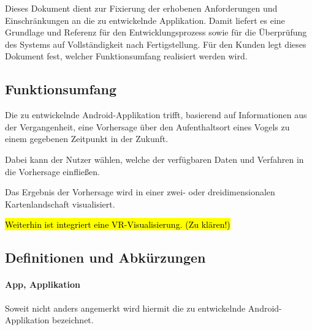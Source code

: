 \documentclass[12pt]{article} %
\begin{document}

 Dieses Dokument dient  zur Fixierung der erhobenen Anforderungen und Einschränkungen an die zu entwickelnde Applikation. Damit liefert es eine Grundlage und Referenz für den Entwicklungsprozess sowie für die Überprüfung des Systems auf Vollständigkeit nach Fertigstellung. Für den Kunden legt dieses Dokument fest, welcher Funktionsumfang realisiert werden wird.


\subsection{Funktionsumfang}

Die zu entwickelnde Android-Applikation trifft, basierend auf Informationen aus der Vergangenheit, eine Vorhersage über den Aufenthaltsort eines Vogels zu einem gegebenen Zeitpunkt in der Zukunft. 

Dabei kann der Nutzer wählen, welche der verfügbaren Daten und Verfahren in die Vorhersage einfließen. 

Das Ergebnis der Vorhersage wird in einer zwei- oder dreidimensionalen Kartenlandschaft visualisiert.

\hl{Weiterhin ist integriert eine VR-Visualisierung. (Zu klären!)}


\subsection{Definitionen und Abkürzungen}



 

\paragraph{App, Applikation} Soweit nicht anders angemerkt wird hiermit die zu entwickelnde Android-Applikation bezeichnet.
\end{document}
